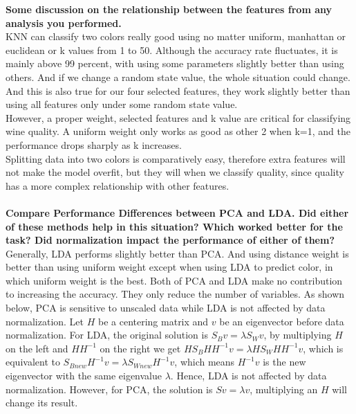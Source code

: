 \documentclass[12pt]{article}
\begin{document}
\noindent
\textbf{Some discussion on the relationship between the features from any analysis you performed.}\\
KNN can classify two colors really good using no matter uniform, manhattan or euclidean or k values from 1 to 50. Although the accuracy rate fluctuates, it is mainly above 99 percent, with using some parameters slightly better than using others. And if we change a random state value, the whole situation could change. And this is also true for our four selected features, they work slightly better than using all features only under some random state value.\\
However, a proper weight, selected features and k value are critical for classifying wine quality. A uniform weight only works as good as other 2 when k=1, and the performance drops sharply as k increases.\\
Splitting data into two colors is comparatively easy, therefore extra features will not make the model overfit, but they will when we classify quality, since quality has a more complex relationship with other features.\\\\ 
\textbf{Compare Performance Differences between PCA and LDA. Did either of these methods help in this situation? Which worked better for the task? Did normalization impact the performance of either of them?}\\
Generally, LDA performs slightly better than PCA. And using distance weight is better than using uniform weight except when using LDA to predict color, in which uniform weight is the best. Both of PCA and LDA make no contribution to increasing the accuracy. They only reduce the number of variables. As shown below, PCA is sensitive to unscaled data while LDA is not affected by data normalization. Let $H$ be a centering matrix and $v$ be an eigenvector before data normalization. For LDA, the original solution is $S_Bv=\lambda S_Wv$, by multiplying $H$ on the left and $HH^{-1}$ on the right we get $HS_BHH^{-1}v=\lambda HS_WHH^{-1}v$, which is equivalent to $S_{Bnew}H^{-1}v=\lambda S_{Wnew}H^{-1}v$, which means $H^{-1}v$ is the new eigenvector with the same eigenvalue $\lambda$. Hence, LDA is not affected by data normalization. However, for PCA, the solution is $Sv=\lambda v$, multiplying an $H$ will change its result.
\end{document}
